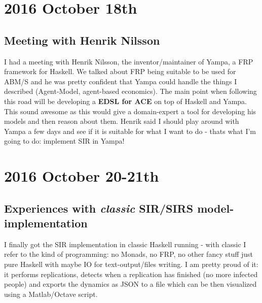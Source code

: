 \section*{2016 October 18th}
\subsection*{Meeting with Henrik Nilsson}
I had a meeting with Henrik Nilsson, the inventor/maintainer of Yampa, a FRP framework for Haskell. We talked about FRP being suitable to be used for ABM/S and he was pretty confident that Yampa could handle the things I described (Agent-Model, agent-based economics). The main point when following this road will be developing a \textbf{EDSL for ACE} on top of Haskell and Yampa. This sound awesome as this would give a domain-expert a tool for developing his models and then reason about them. Henrik said I should play around with Yampa a few days and see if it is suitable for what I want to do - thats what I'm going to do: implement SIR in Yampa!

 
\section*{2016 October 20-21th}
\subsection*{Experiences with \textit{classic} SIR/SIRS model-implementation}
I finally got the SIR implementation in classic Haskell running - with classic I refer to the kind of programming: no Monads, no FRP, no other fancy stuff just pure Haskell with maybe IO for text-output/files writing. I am pretty proud of it: it performs replications, detects when a replication has finished (no more infected people) and exports the dynamics as JSON to a file which can be then visualized using a Matlab/Octave script.

